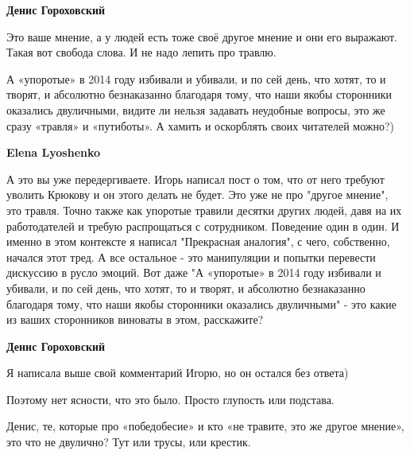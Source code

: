 \begin{itemize}
\begin{itemize}
\textbf{Денис Гороховский}

Это ваше мнение, а у людей есть тоже своё другое мнение и они его выражают.
Такая вот свобода слова. И не надо лепить про травлю.

А «упоротые» в 2014 году избивали и убивали, и по сей день, что хотят, то и
творят, и абсолютно безнаказанно благодаря тому, что наши якобы сторонники
оказались двуличными, видите ли нельзя задавать неудобные вопросы, это же сразу
«травля» и «путиботы». А хамить и оскорблять своих читателей можно?)

 

\textbf{Elena Lyoshenko} 

А это вы уже передергиваете. Игорь написал пост о том, что от него требуют
уволить Крюкову и он этого делать не будет. Это уже не про "другое мнение", это
травля. Точно также как упоротые травили десятки других людей, давя на их
работодателей и требую распрощаться с сотрудником. Поведение один в один. И
именно в этом контексте я написал "Прекрасная аналогия", с чего, собственно,
начался этот тред. А все остальное - это манипуляции и попытки перевести
дискуссию в русло эмоций. Вот даже "А «упоротые» в 2014 году избивали и
убивали, и по сей день, что хотят, то и творят, и абсолютно безнаказанно
благодаря тому, что наши якобы сторонники оказались двуличными" - это какие из
ваших сторонников виноваты в этом, расскажите?

 

\textbf{Денис Гороховский}

Я написала выше свой комментарий Игорю, но он остался без ответа)

Поэтому нет ясности, что это было. Просто глупость или подстава.

Денис, те, которые про «победобесие» и кто «не травите, это же другое мнение»,
это что не двулично? Тут или трусы, или крестик.

 


\end{itemize}
\end{itemize}
